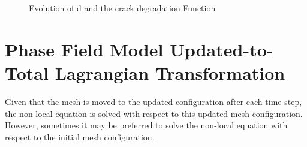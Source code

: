 \documentclass[sn-mathphys,Numbered,draft]{sn-jnl}%
\begin{document}
\begin{appendices}
\begin{figure}[htbp]
	\centering
		
		
		\caption{Evolution of d and the crack degradation Function}
	\label{label_for_entire_figure}
\end{figure}



\section{Phase Field Model Updated-to-Total Lagrangian Transformation}
Given that the mesh is moved to the updated configuration after each time step, the non-local equation is solved with respect to this updated mesh configuration. However, sometimes it may be preferred to solve the non-local equation with respect to the initial mesh configuration.


\end{appendices}
\end{document}
